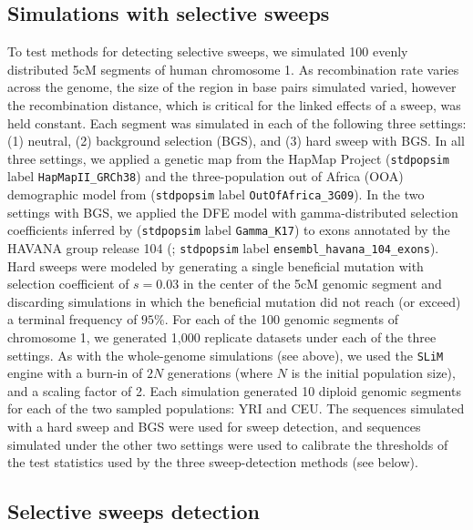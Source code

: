 \documentclass[hidelinks]{article}
\newcommand{\stdpopsim}{\texttt{stdpopsim}\xspace}
\newcommand{\slim}{\texttt{SLiM}\xspace}
\newcommand{\drscomment}[1]{\textcolor{purple}{DRS: #1}}
\begin{document}
    \subsection*{Simulations with selective sweeps}

    To test methods for detecting selective sweeps, we simulated 100 evenly distributed 5cM
    segments of human chromosome 1.
    As recombination rate varies across the genome, the size of the region in base pairs simulated varied, however the recombination distance,
    which is critical for the linked effects of a sweep, was held constant.
    Each segment was simulated in each of the following three settings:
    (1) neutral, (2) background selection (BGS), and (3) hard sweep with BGS.
    In all three settings, we applied a genetic map from the HapMap Project
    \citep{international2007second} (\stdpopsim label \texttt{HapMapII\_GRCh38}) and
    the three-population out of Africa (OOA) demographic model from
    \cite{gutenkunst2009inferring} (\stdpopsim label \texttt{OutOfAfrica\_3G09}).
    In the two settings with BGS, we applied the DFE model with gamma-distributed selection coefficients inferred by
    \cite{kim2017inference} (\stdpopsim label \texttt{Gamma\_K17}) to exons annotated by the HAVANA group release 104
    (\cite{ensembl2018}; \stdpopsim label \texttt{ensembl\_havana\_104\_exons}).
    Hard sweeps were modeled by generating a single beneficial mutation 
    with selection coefficient of $s = 0.03$ in the center of the 5cM genomic segment
    and discarding simulations in which the beneficial mutation did not reach (or exceed) a terminal frequency of $95\%$.
    For each of the 100 genomic segments of chromosome 1, we generated 1,000 replicate datasets under each of the three settings.
    As with the whole-genome simulations (see above), we used the \slim engine with a burn-in of $2N$ generations
    (where $N$ is the initial population size), and a scaling factor of 2.
    Each simulation generated 10 diploid genomic segments for each of the two sampled populations: YRI and CEU.
    The sequences simulated with a hard sweep and BGS were used for sweep detection,
    and sequences simulated under the other two settings were used to calibrate the thresholds of the test statistics
    used by the three sweep-detection methods (see below).

    \subsection*{Selective sweeps detection}
    
\end{document}
